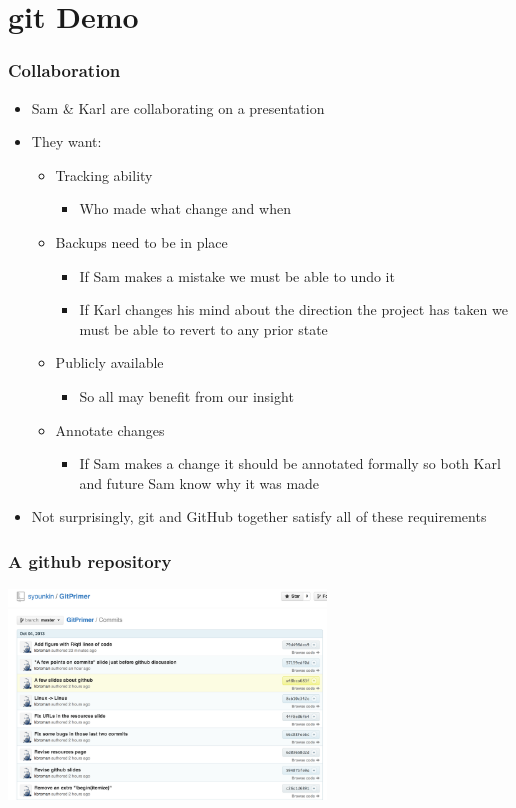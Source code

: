 \documentclass[handout,13pt,compress,c]{beamer}
\newcommand{\bi}{\begin{itemize}}
\newcommand{\ei}{\end{itemize}}
\begin{document}
\section{git Demo}
\begin{frame}[fragile]
\frametitle{Collaboration}
\bi
\item Sam \& Karl are collaborating on a presentation
\item They want:
\bi
\item Tracking ability
\bi\item Who made what change and when\ei
\item Backups need to be in place
\bi\item If Sam makes a mistake we must be able to undo it
\item If Karl changes his mind about the direction the project has taken we must be able to revert to any prior state
\ei
\item Publicly available
\bi\item So all may benefit from our insight\ei
\item Annotate changes
\bi\item If Sam makes a change it should be annotated formally so both Karl and future Sam know why it was made\ei
\ei
\item Not surprisingly, git and GitHub together satisfy all of these requirements
\ei
\end{frame}

\begin{frame}
\frametitle{A github repository}

\vfill
\includegraphics[height=2.2in]{list_of_commits.png}
\end{frame}
\end{document}

